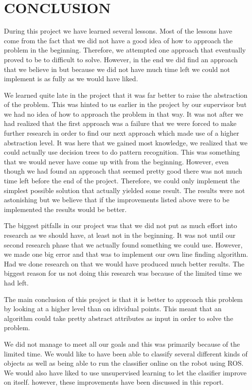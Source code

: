 \documentclass[a4paper, 10pt, conference]{ieeeconf}      %
\begin{document}
\section{CONCLUSION}
During this project we have learned several lessons. Most of the lessons have come from the fact that we did not have a good idea of how to approach the problem in the beginning. Therefore, we attempted one approach that eventually proved to be to difficult to solve. However, in the end we did find an approach that we believe in but because we did not have much time left we could not implement is as fully as we would have liked.

We learned quite late in the project that it was far better to raise the abstraction of the problem. This was hinted to us earlier in the project by our supervisor but we had no idea of how to approach the problem in that way. It was not after we had realized that the first approach was a failure that we were forced to make further research in order to find our next approach which made use of a higher abstraction level. It was here that we gained most knowledge, we realized that we could actually use decision trees to do pattern recognition. This was something that we would never have come up with from the beginning. However, even though we had found an approach that seemed pretty good there was not much time left before the end of the project. Therefore, we could only implement the simplest possible solution that actually yielded some result. The results were not astonishing but we believe that if the improvements listed above were to be implemented the results would be better.

The biggest pitfalls in our project was that we did not put as much effort into research as we should have, at least not in the beginning. It was not until our second research phase that we actually found something we could use. However, we made one big error and that was to implement our own line finding algorithm. Had we done research on that we would have produced much better results. The biggest reason for us not doing this research was because of the limited time we had left.

The main conclusion of this project is that it is better to approach this problem by looking at a higher level than on idividual points. This meant that an algorithm could take pretty abstract attributes as input in order to solve the problem.

We did not manage to meet all our goals and this was primarily because of the limited time. We would like to have been able to classify several different kinds of objects as well as being able to run the classifier online on the robot using ROS. We would also have liked to use unsupervised learning to let the clasifier improve on itself. however, these improvements have been discussed in this report.
\end{document}
